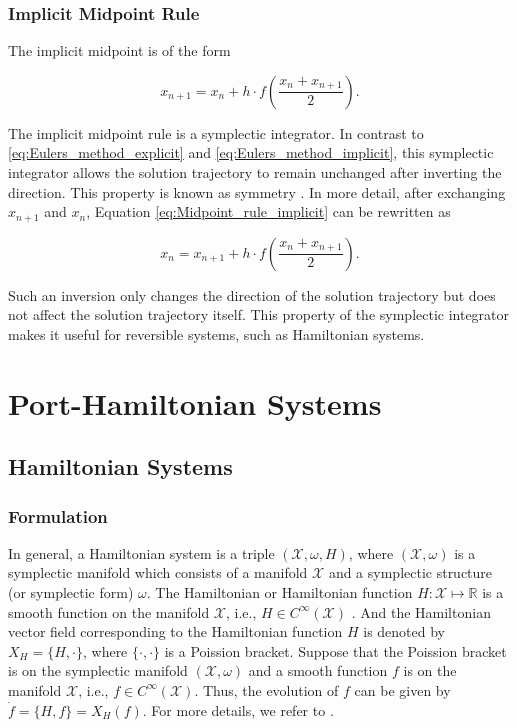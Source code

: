\documentclass[
	parskip, 			   %
	twoside, 			   %
	DIV=14, 			   %
	BCOR=15.0mm, 		   %
	headsepline, 		   %
	open=right, 		   %
	captions=tableheading, %
	bibliography=totoc,    %
	numbers=noenddot       %
]{scrreprt}
\begin{document}
\subsection{Implicit Midpoint Rule}
The implicit midpoint is of the form

\begin{equation}
    \label{eq:Midpoint_rule_implicit}
    x_{n+1} = x_{n} + h \cdot f\left(\frac{x_{n} + x_{n+1}}{2}\right).
\end{equation}

The implicit midpoint rule is a symplectic integrator. In contrast to \ref{eq:Eulers_method_explicit} and \ref{eq:Eulers_method_implicit}, this symplectic integrator allows the solution trajectory to remain unchanged after inverting the direction. This property is known as symmetry \cite{hairer2006geometric}. In more detail, after exchanging $x_{n+1}$ and $x_{n}$, Equation \ref{eq:Midpoint_rule_implicit} can be rewritten as

\begin{equation}
    \label{eq:Midpoint_rule_implicit_inverted}
    x_{n} = x_{n+1} + h \cdot f\left(\frac{x_{n} + x_{n+1}}{2}\right).
\end{equation}

Such an inversion only changes the direction of the solution trajectory but does not affect the solution trajectory itself. This property of the symplectic integrator makes it useful for reversible systems, such as Hamiltonian systems.

\clearpage
\chapter{Port-Hamiltonian Systems}
\label{ch:chapter3}

\section{Hamiltonian Systems}

\subsection{Formulation}
In general, a Hamiltonian system is a triple $(\mathcal{X},\omega,H)$, where $(\mathcal{X},\omega)$ is a symplectic manifold which consists of a manifold $\mathcal{X}$ and a symplectic structure (or symplectic form) $\omega$. The Hamiltonian or Hamiltonian function $H: \mathcal{X} \mapsto \mathbb{R} $ is a smooth function on the manifold $\mathcal{X}$, i.e., $H \in C^{\infty}(\mathcal{X})$ \cite{rudolph2017differential}. And the Hamiltonian vector field corresponding to the Hamiltonian function $H$ is denoted by $X_H = \{H, \cdot \}$, where $\{\cdot, \cdot\}$ is a Poission bracket. Suppose that the Poission bracket is on the symplectic manifold $(\mathcal{X},\omega)$ and a smooth function $f$ is on the manifold $\mathcal{X}$, i.e., $f \in C^{\infty}(\mathcal{X}) $. Thus, the evolution of $f$ can be given by $\dot{f} = \{H, f\} = X_H(f)$. For more details, we refer to \cite{rudolph2012differential}.
\end{document}
